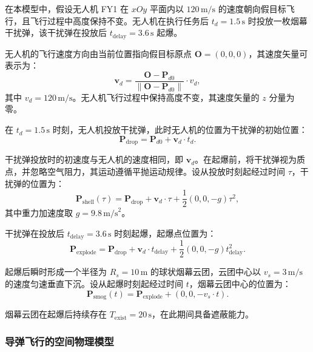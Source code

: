 \documentclass[12pt]{article}
\begin{document}
\begin{CJK}{UTF8}{gbsn}
		在本模型中，假设无人机 FY1 在 $xOy$ 平面内以 $120 \, \mathrm{m/s}$ 的速度朝向假目标飞行，且飞行过程中高度保持不变。无人机在执行任务后 $t_d = 1.5 \, \mathrm{s}$ 时投放一枚烟幕干扰弹，该干扰弹在投放后 $t_{\text{delay}} = 3.6 \, \mathrm{s}$ 起爆。
		
		无人机的飞行速度方向由当前位置指向假目标原点 $\mathbf{O} = (0, 0, 0)$，其速度矢量可表示为：
		\begin{equation}
			\mathbf{v}_d = \frac{\mathbf{O} - \mathbf{P}_{d0}}{\| \mathbf{O} - \mathbf{P}_{d0} \|} \cdot v_d,
		\end{equation}
		其中 $v_d = 120 \, \mathrm{m/s}$。无人机飞行过程中保持高度不变，其速度矢量的 $z$ 分量为零。
		
		在 $t_d = 1.5 \, \mathrm{s}$ 时刻，无人机投放干扰弹，此时无人机的位置为干扰弹的初始位置：
		\begin{equation}
			\mathbf{P}_{\text{drop}} = \mathbf{P}_{d0} + \mathbf{v}_d \cdot t_d.
		\end{equation}
		
		干扰弹投放时的初速度与无人机的速度相同，即 $\mathbf{v}_d$。在起爆前，将干扰弹视为质点，并忽略空气阻力，其运动遵循平抛运动规律。设从投放时刻起经过时间 $\tau$，干扰弹的位置为：
		\begin{equation}
			\mathbf{P}_{\text{shell}}(\tau) = \mathbf{P}_{\text{drop}} + \mathbf{v}_d \cdot \tau + \frac{1}{2} (0, 0, -g) \tau^2,
		\end{equation}
		其中重力加速度取 $g = 9.8 \, \mathrm{m/s}^2$。
		
		干扰弹在投放后 $t_{\text{delay}} = 3.6 \, \mathrm{s}$ 时刻起爆，起爆点位置为：
		\begin{equation}
			\mathbf{P}_{\text{explode}} = \mathbf{P}_{\text{drop}} + \mathbf{v}_d \cdot t_{\text{delay}} + \frac{1}{2} (0, 0, -g) t_{\text{delay}}^2.
		\end{equation}
		
		起爆后瞬时形成一个半径为 $R_s = 10 \, \mathrm{m}$ 的球状烟幕云团，云团中心以 $v_s = 3 \, \mathrm{m/s}$ 的速度匀速垂直下沉。设从起爆时刻起经过时间 $t$，烟幕云团中心的位置为：
		\begin{equation}
			\mathbf{P}_{\text{smog}}(t) = \mathbf{P}_{\text{explode}} + (0, 0, -v_s \cdot t).
		\end{equation}
		
		烟幕云团在起爆后持续存在 $T_{\text{exist}} = 20 \, \mathrm{s}$，在此期间具备遮蔽能力。
		
		\subsubsection{导弹飞行的空间物理模型}
		

\end{CJK}
\end{document}
